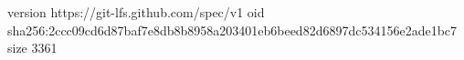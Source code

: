 version https://git-lfs.github.com/spec/v1
oid sha256:2ccc09cd6d87baf7e8db8b8958a203401eb6beed82d6897dc534156e2ade1bc7
size 3361
